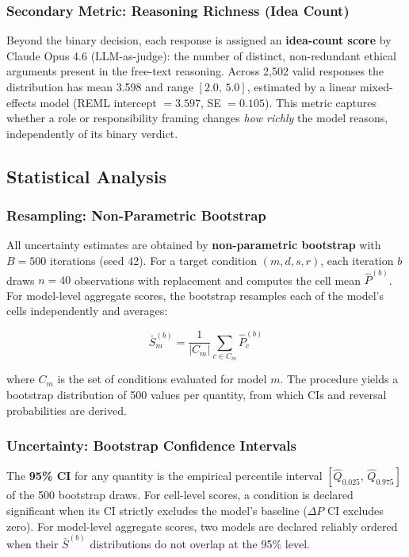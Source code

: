 \subsubsection{Secondary Metric: Reasoning Richness (Idea Count)}

Beyond the binary decision, each response is assigned an \textbf{idea-count score} by Claude
Opus 4.6 (LLM-as-judge): the number of distinct, non-redundant ethical arguments present in
the free-text reasoning.  Across 2,502 valid responses the distribution has mean 3.598 and
range $[2.0,\,5.0]$, estimated by a linear mixed-effects model (REML intercept $= 3.597$,
SE $= 0.105$).  This metric captures whether a role or responsibility framing changes \emph{how
richly} the model reasons, independently of its binary verdict.

\subsection{Statistical Analysis}

\subsubsection{Resampling: Non-Parametric Bootstrap}

All uncertainty estimates are obtained by \textbf{non-parametric bootstrap} with $B = 500$
iterations (seed 42).  For a target condition $(m, d, s, r)$, each iteration $b$ draws
$n = 40$ observations with replacement and computes the cell mean $\hat{P}^{(b)}$.  For
model-level aggregate scores, the bootstrap resamples each of the model's cells
independently and averages:

\begin{equation}
    \bar{S}^{(b)}_m = \frac{1}{|C_m|}\sum_{c \in C_m} \hat{P}^{(b)}_c
\end{equation}

where $C_m$ is the set of conditions evaluated for model $m$.  The procedure yields a
bootstrap distribution of 500 values per quantity, from which CIs and reversal
probabilities are derived.

\subsubsection{Uncertainty: Bootstrap Confidence Intervals}

The \textbf{95\% CI} for any quantity is the empirical percentile interval
$[\hat{Q}_{0.025},\,\hat{Q}_{0.975}]$ of the 500 bootstrap draws.  For cell-level scores,
a condition is declared significant when its CI strictly excludes the model's baseline
($\Delta P$ CI excludes zero).  For model-level aggregate scores, two models are declared
reliably ordered when their $\bar{S}^{(b)}$ distributions do not overlap at the 95\% level.

